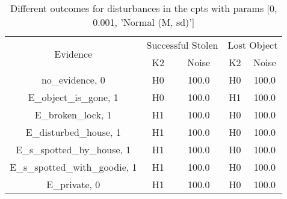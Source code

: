 \begin{table}\begin{tabular}{c|cc|cc}\toprule\multirow{2}{*}{Evidence} & \multicolumn{2}{c}{Successful Stolen} & \multicolumn{2}{c}{Lost Object} \\& {K2} & {Noise} & {K2} & {Noise} \\\midrule
no\_evidence, 0 & H0&100.0&H0&100.0\\E\_object\_is\_gone, 1 & H0&100.0&H1&100.0\\E\_broken\_lock, 1 & H1&100.0&H0&100.0\\E\_disturbed\_house, 1 & H1&100.0&H0&100.0\\E\_s\_spotted\_by\_house, 1 & H1&100.0&H0&100.0\\E\_s\_spotted\_with\_goodie, 1 & H1&100.0&H0&100.0\\E\_private, 0 & H1&100.0&H0&100.0\\\bottomrule\end{tabular}\caption{Different outcomes for disturbances in the cpts with params [0, 0.001, 'Normal (M, sd)']}\end{table}